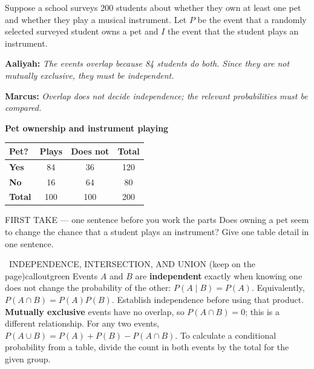 \documentclass[11pt]{article}
\begin{document}
\clearpage
{}

Suppose a school surveys 200 students about whether they own at least one pet and whether they play a musical instrument. Let $P$ be the event that a randomly selected surveyed student owns a pet and $I$ the event that the student plays an instrument.\par\smallskip \textbf{Aaliyah:} \emph{The events overlap because 84 students do both. Since they are not mutually exclusive, they must be independent.}\par \textbf{Marcus:} \emph{Overlap does not decide independence; the relevant probabilities must be compared.}\par
\begin{center}
\textbf{Pet ownership and instrument playing}\par\smallskip
\begin{tabular}{|l|c|c|c|}
\hline
\textbf{Pet?} & \textbf{Plays} & \textbf{Does not} & \textbf{Total} \\ \hline
\textbf{Yes} & 84 & 36 & 120 \\ \hline
\textbf{No} & 16 & 64 & 80 \\ \hline
\textbf{Total} & 100 & 100 & 200 \\ \hline
\end{tabular}
\end{center}
\begin{firsttakebox}{FIRST TAKE --- one sentence before you work the parts}
Does owning a pet seem to change the chance that a student plays an instrument? Give one table detail in one sentence.\par
{}
\end{firsttakebox}

\begin{callout}{\IconBook\ INDEPENDENCE, INTERSECTION, AND UNION (keep on the page)}{calloutgreen}
Events $A$ and $B$ are \textbf{independent} exactly when knowing one does not change the probability of the other:
$P(A\mid B)=P(A)$. Equivalently, $P(A\cap B)=P(A)P(B)$. Establish independence before using that product.
\textbf{Mutually exclusive} events have no overlap, so $P(A\cap B)=0$; this is a different relationship.
For any two events, $P(A\cup B)=P(A)+P(B)-P(A\cap B)$. To calculate a conditional probability from a table, divide the count in both events by the total for the given group.
\end{callout}
\end{document}
